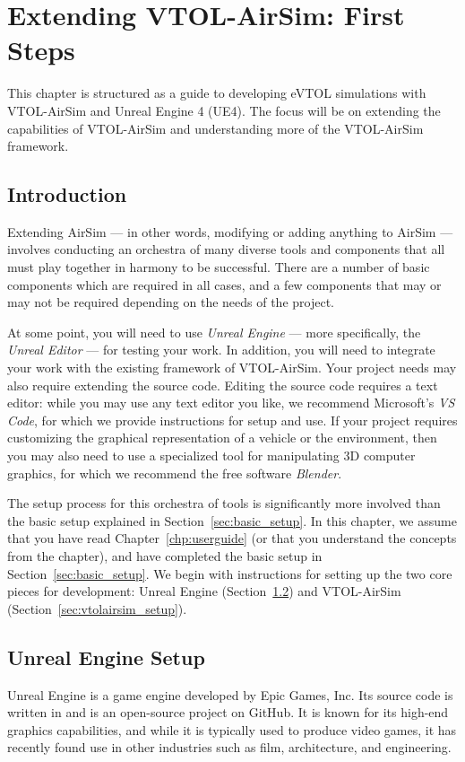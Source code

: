 
\chapter{Extending VTOL-AirSim: First Steps}\label{chp:extending}

This chapter is structured as a guide to developing eVTOL simulations with VTOL-AirSim and Unreal Engine 4 (UE4). The focus will be on extending the capabilities of VTOL-AirSim and understanding more of the VTOL-AirSim framework.


\section{Introduction}
Extending AirSim --- in other words, modifying or adding anything to AirSim --- involves conducting an orchestra of many diverse tools and components that all must play together in harmony to be successful. There are a number of basic components which are required in all cases, and a few components that may or may not be required depending on the needs of the project.

At some point, you will need to use \textit{Unreal Engine} --- more specifically, the \textit{Unreal Editor} --- for testing your work. In addition, you will need to integrate your work with the existing framework of VTOL-AirSim. Your project needs may also require extending the source code. Editing the source code requires a text editor: while you may use any text editor you like, we recommend Microsoft's \textit{VS Code}, for which we provide instructions for setup and use. If your project requires customizing the graphical representation of a vehicle or the environment, then you may also need to use a specialized tool for manipulating 3D computer graphics, for which we recommend the free software \textit{Blender}.

The setup process for this orchestra of tools is significantly more involved than the basic setup explained in Section~\ref{sec:basic_setup}. In this chapter, we assume that you have read Chapter~\ref{chp:userguide} (or that you understand the concepts from the chapter), and have completed the basic setup in Section~\ref{sec:basic_setup}. We begin with instructions for setting up the two core pieces for development: Unreal Engine (Section~\ref{sec:unreal_setup}) and VTOL-AirSim (Section~\ref{sec:vtolairsim_setup}).

\section{Unreal Engine Setup}\label{sec:unreal_setup}
Unreal Engine is a game engine developed by Epic Games, Inc. Its source code is written in \CC and is an open-source project on GitHub. It is known for its high-end graphics capabilities, and while it is typically used to produce video games, it has recently found use in other industries such as film, architecture, and engineering.

